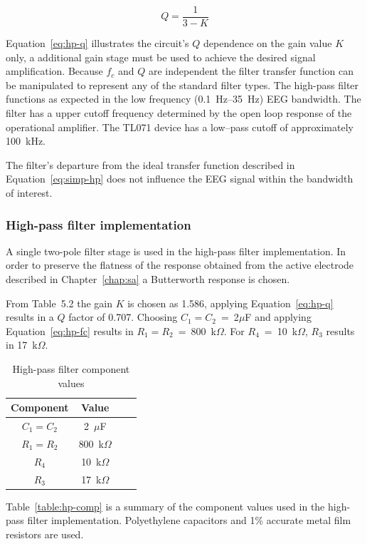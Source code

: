 \begin{equation}
	Q = \frac{1}{3 - K}
	\label{eq:hp-q}
\end{equation}

Equation~\ref{eq:hp-q} illustrates the circuit's $Q$ dependence on the
gain value $K$ only, a additional gain stage must be used to achieve
the desired signal amplification. Because $f_c$ and $Q$ are
independent the filter transfer function can be manipulated to
represent any of the standard filter types. The high-pass filter
functions as expected in the low frequency (0.1~Hz--35~Hz) EEG
bandwidth. The filter has a upper cutoff frequency determined by the
open loop response of the operational amplifier. The TL071 device has
a low--pass cutoff of approximately 100~kHz.

The filter's departure from the ideal transfer function described in
Equation~\ref{eq:simp-hp} does not influence the EEG signal within the
bandwidth of interest.

\subsubsection{High-pass filter implementation}
A single two-pole filter stage is used in the high-pass filter
implementation. In order to preserve the flatness of the response
obtained from the active electrode described in Chapter~\vref{chap:sa}
a Butterworth response is chosen.

From \cite[p274]{art} Table~5.2 the gain $K$ is chosen as 1.586,
applying Equation~\ref{eq:hp-q} results in a $Q$ factor of
0.707. Choosing $C_1 = C_2$~=~2$\mu$F and applying
Equation~\ref{eq:hp-fc} results in $R_1 = R_2$~=~800~k$\Omega$. For
$R_4$~=~10~k$\Omega$, $R_3$ results in 17~k$\Omega$.


\begin{table}
\begin{center}	
	\begin{tabular}[htpb]{|c|c|c|c|} \hline
	Component & Value \\ \hline
	$C_1 = C_2$ & 2~$\mu$F \\
	$R_1 = R_2$ & 800~k$\Omega$ \\ 
	$R_4$ & 10~k$\Omega$ \\
	$R_3$ & 17~k$\Omega$ \\
	\hline
	\end{tabular}
	\caption{High-pass filter component values}
	\label{table:hp-comp}
\end{center}	
\end{table}
Table~\vref{table:hp-comp} is a summary of the component values used in
the high-pass filter implementation. Polyethylene capacitors and 1\%
accurate metal film resistors are used.



